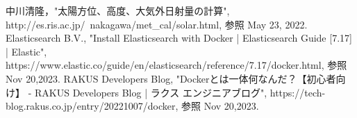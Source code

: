 \begin{thebibliography}{99}

中川清隆，"太陽方位、高度、大気外日射量の計算",\\ http://es.ris.ac.jp/~nakagawa/met\_cal/solar.html, 参照 May 23, 2022.
Elasticsearch B.V., "Install Elasticsearch with Docker | Elasticsearch Guide [7.17] | Elastic",\\ https://www.elastic.co/guide/en/elasticsearch/reference/7.17/docker.html, 参照 Nov 20,2023.
RAKUS Developers Blog, "Dockerとは一体何なんだ？【初心者向け】 - RAKUS Developers Blog | ラクス エンジニアブログ", https://tech-blog.rakus.co.jp/entry/20221007/docker, 参照 Nov 20,2023.
\end{thebibliography}
